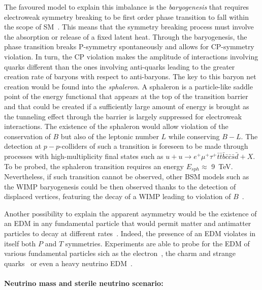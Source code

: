 	The favoured model to explain this imbalance is the \textit{baryogenesis} that requires electroweak symmetry breaking to be first order phase transition to fall within the scope of SM~\cite{KUZMIN1985,CANETTI2012}. This means that the symmetry breaking process must involve the absorption or release of a fixed latent heat. Through the baryogenesis, the phase transition breaks P-symmetry spontaneously and allows for CP-symmetry violation. In turn, the CP violation makes the amplitude of interactions involving quarks different than the ones involving anti-quarks leading to the greater creation rate of baryons with respect to anti-baryons. The key to this baryon net creation would be found into the \textit{sphaleron}. A sphaleron is a particle-like saddle point of the energy functional that appears at the top of the transition barrier and that could be created if a sufficiently large amount of energy is brought as the tunneling effect through the barrier is largely suppressed for electroweak interactions. The existence of the sphaleron would allow violation of the conservation of $B$ but also of the leptonic number $L$ while conserving $B-L$. The detection at $p-p$-colliders of such a transition is foreseen to be made through processes with high-multiplicity final states such as $u + u \rightarrow e^+\mu^+\tau^+\bar{t}\bar{t}\bar{b}\bar{c}\bar{c}\bar{s}\bar{d} + X$\cite{CMSSPHALERON2018}. To be probed, the sphaleron transition requires an energy $E_{sph} \approx$ \SI{9}{TeV}. Nevertheless, if such transition cannot be observed, other BSM models such as the WIMP baryogenesis could be then observed thanks to the detection of displaced vertices, featuring the decay of a WIMP leading to violation of $B$~\cite{SHUVE2015}.
	
	Another possibility to explain the apparent asymmetry would be the existence of an \acf{EDM} in any fundamental particle that would permit matter and antimatter particles to decay at different rates~\cite{ACME2014}. Indeed, the presence of an EDM violates in itself both $P$ and $T$ symmetries. Experiments are able to probe for the EDM of various fundamental particles sich as the electron~\cite{ACME2014}, the charm and strange quarks~\cite{NERI2017} or even a heavy neutrino EDM~\cite{STEVENS2018}.\\
	
	\paragraph*{Neutrino mass and sterile neutrino scenario: }
	

